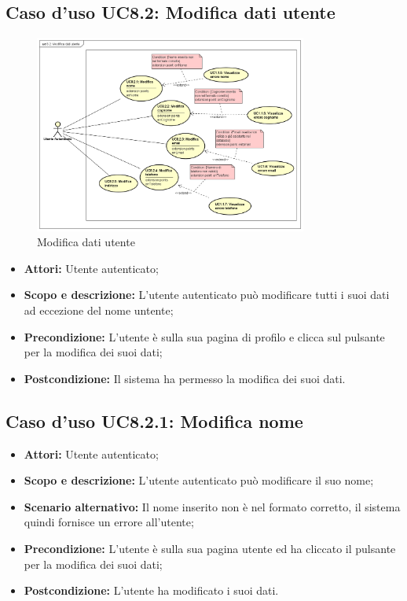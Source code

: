 \documentclass[12pt,a4paper,titlepage]{article}
\begin{document}
	\subsection{Caso d'uso UC8.2: Modifica dati utente}
	\label{UC8.2}
	\begin{figure}[H]
		\centering
		\includegraphics[width=0.8\textwidth]{UseCase/ModificaDatiUtente}
		\caption{Modifica dati utente}
	\end{figure}
	\begin{itemize}
		\item \textbf{Attori: }Utente autenticato;
		\item \textbf{Scopo e descrizione: }L'utente autenticato può modificare tutti i suoi dati ad eccezione del nome untente;
		\item \textbf{Precondizione: }L'utente è sulla sua pagina di profilo e clicca sul pulsante per la modifica dei suoi dati;
		\item \textbf{Postcondizione: }Il sistema ha permesso la modifica dei suoi dati.
	\end{itemize}
	\subsection{Caso d'uso UC8.2.1: Modifica nome}
	\label{UC8.2.1}
	\begin{itemize}
		\item \textbf{Attori: }Utente autenticato;
		\item \textbf{Scopo e descrizione: }L'utente autenticato può modificare il suo nome;
		\item \textbf{Scenario alternativo: }Il nome inserito non è nel formato corretto, il sistema quindi fornisce un errore all'utente;
		\item \textbf{Precondizione: }L'utente è sulla sua pagina utente ed ha cliccato il pulsante per la modifica dei suoi dati;
		\item \textbf{Postcondizione: }L'utente ha modificato i suoi dati.
	\end{itemize}
\end{document}
